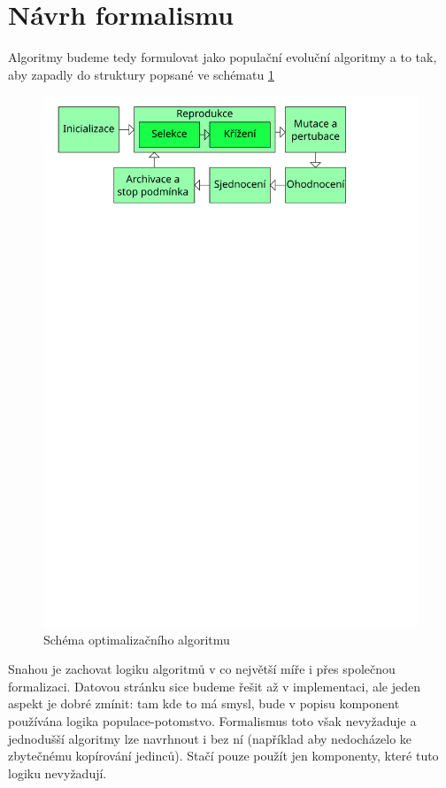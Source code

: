 \section{Návrh formalismu}

Algoritmy budeme tedy formulovat jako populační evoluční algoritmy a to tak, aby zapadly do struktury popsané ve schématu \ref{naseschema}

\begin{figure}[h!]
  \includegraphics[width=\textwidth]{img/OASchema2}
  \caption{Schéma optimalizačního algoritmu}
  \label{naseschema}
\end{figure}

Snahou je zachovat logiku algoritmů v co největší míře i přes společnou formalizaci. Datovou stránku sice budeme řešit až v implementaci, ale jeden aspekt je dobré zmínit: tam kde to má smysl, bude v popisu komponent používána logika populace-potomstvo. Formalismus toto však nevyžaduje a jednodušší algoritmy lze navrhnout i bez ní (například aby nedocházelo ke zbytečnému kopírování jedinců). Stačí pouze použít jen komponenty, které tuto logiku nevyžadují.


